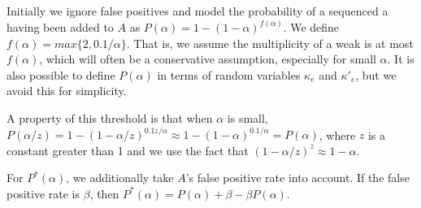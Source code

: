 \documentclass[10pt]{article}
\begin{document}
Initially we ignore false positives and model the probability of a sequenced a \kmer having been added to $A$ as $P(\alpha)=1-(1-\alpha)^{f(\alpha)}$.  We define $f(\alpha)=max\{2,0.1/\alpha\}$.  That is, we assume the multiplicity of a weak \kmer is at most $f(\alpha)$, which will often be a conservative assumption, especially for small $\alpha$.  It is also possible to define $P(\alpha)$ in terms of random variables $\kappa_e$ and $\kappa'_e$, but we avoid this for simplicity.

A property of this threshold is that when $\alpha$ is small, $P(\alpha/z)=1-(1-\alpha/z)^{0.1z/\alpha}\approx 1-(1-\alpha)^{0.1/\alpha}=P(\alpha)$, where $z$ is a constant greater than 1 and we use the fact that $(1-\alpha/z)^z\approx 1-\alpha$.

For $P^*(\alpha)$, we additionally take $A$'s false positive rate into account.  If the false positive rate is $\beta$, then $P^*(\alpha)=P(\alpha)+\beta-\beta P(\alpha)$.







\end{document}
